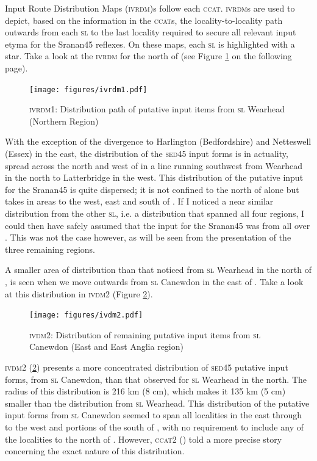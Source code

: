 Input  Route Distribution Maps (\textsc{ivrdm})s follow each \textsc{ccat}. \textsc{ivrdm}s are used to depict, based on the information in the \textsc{ccat}s, the locality-to-locality path outwards from each \textsc{sl} to the last locality required to secure all relevant input etyma for the Sranan45 reflexes. On these maps, each \textsc{sl} is highlighted with a star. Take a look at the \textsc{ivrdm} for the north of  (see Figure \ref{Map5.5b} on the following page).


\begin{figure}
\texttt{[image: figures/ivrdm1.pdf]}
\addtocounter{figure}{-1}\renewcommand{\thefigure}{\arabic{figure}.5b}
\caption {\textsc{ivrdm1}: Distribution path of putative input items from \textsc{sl} Wearhead (Northern Region)} 
\label{Map5.5b}
\end{figure}

With the exception of the divergence to Harlington (Bedfordshire) and Netteswell (Essex) in the east, the distribution of the \textsc{sed45} input forms is in actuality, spread across the north and west of  in a line running southwest from Wearhead in the north to Latterbridge in the west. This distribution of the putative input for the Sranan45 is quite dispersed; it is not confined to the north of  alone but takes in areas to the west, east and south of . If I noticed a near similar distribution from the other \textsc{sl}, i.e. a distribution that spanned all four regions, I could then have safely assumed that the input for the Sranan45 was from all over . This was not the case however, as will be seen from the presentation of the three remaining regions.

A smaller area of distribution than that noticed from \textsc{sl} Wearhead in the north of , is seen when we move outwards from \textsc{sl} Canewdon in the east of . Take a look at this distribution in \textsc{ivdm2} (Figure \ref{Map5.6a}).

\begin{figure}
\texttt{[image: figures/ivdm2.pdf]}
\addtocounter{figure}{-1}\renewcommand{\thefigure}{\arabic{figure}.6a}
\caption {\textsc{ivdm2}: Distribution of remaining putative input items from \textsc{sl} Canewdon (East and East Anglia region)} 
\label{Map5.6a}
\end{figure}


\textsc{ivdm2} (\ref{Map5.6a}) presents a more concentrated distribution of \textsc{sed45} putative input forms, from \textsc{sl} Canewdon, than that observed for \textsc{sl} Wearhead in the north. The radius of this distribution is 216 km (8 cm), which makes it 135 km (5 cm) smaller than the distribution from \textsc{sl} Wearhead. This distribution of the putative input forms from \textsc{sl} Canewdon seemed to span all localities in the east through to the west and portions of the south of , with no requirement to include any of the localities to the north of . However, \textsc{ccat2} () told a more precise story concerning the exact nature of this distribution.

